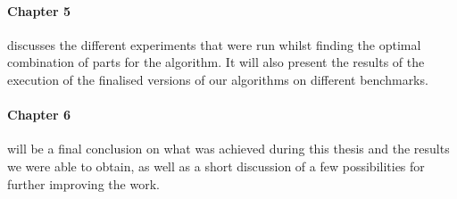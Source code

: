 \paragraph{Chapter 5}discusses the different experiments that were run whilst finding the optimal combination of parts for the algorithm. It will also present the results of the execution of the finalised versions of our algorithms on different benchmarks.

\paragraph{Chapter 6}will be a final conclusion on what was achieved during this thesis and the results we were able to obtain, as well as a short discussion of a few possibilities for further improving the work.









